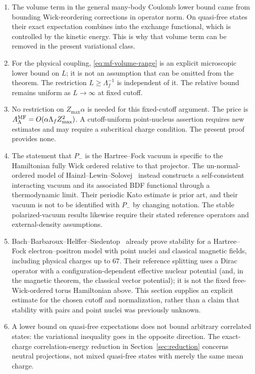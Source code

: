 \begin{remark}
\label{rem:mf-scope}
\begin{enumerate}[label=(\alph*)]
\item The volume term in the general many-body Coulomb lower bound came
from bounding Wick-reordering corrections in operator norm.  On quasi-free
states their exact expectation combines into the exchange functional,
which is controlled by the kinetic energy.  This is why that volume term
can be removed in the present variational class.
\item For the physical coupling, \eqref{eq:mf-volume-range} is an explicit
microscopic lower bound on $L$; it is not an assumption that can be omitted
from the theorem.  The restriction $L\ge\Lambda_f^{-1}$ is independent of
it.  The relative bound remains uniform as $L\to\infty$ at fixed cutoff.
\item No restriction on $Z_{\max}\alpha$ is needed for this fixed-cutoff
argument.  The price is $A^{\rm MF}_\Lambda=O(\alpha\Lambda_fZ_{\max}^2)$.
A cutoff-uniform point-nucleus assertion requires new estimates and may
require a subcritical charge condition.  The present proof provides none.
\item The statement that $P_-$ is the Hartree--Fock vacuum is specific to
the Hamiltonian fully Wick ordered relative to that projector.  The
un-normal-ordered model of Hainzl--Lewin--Solovej~\cite{HLSol2007} instead
constructs a self-consistent interacting vacuum and its associated BDF
functional through a thermodynamic limit.  Their periodic Kato estimate
is prior art, and their vacuum is not to be identified with $P_-$ by
changing notation.  The stable polarized-vacuum results
\cite{HLS2005,HLS2008} likewise require their stated reference operators
and external-density assumptions.
\item Bach--Barbaroux--Helffer--Siedentop~\cite{BBHS1998} already prove
stability for a Hartree--Fock electron--positron model with point nuclei
and classical magnetic fields, including physical charges up to $67$.
Their reference splitting uses a Dirac operator with a configuration-dependent
effective nuclear potential (and, in the magnetic theorem, the classical
vector potential); it is not the fixed free-Wick-ordered torus Hamiltonian above.
This section supplies an explicit estimate for the chosen cutoff and
normalization, rather than a claim that stability with pairs and point
nuclei was previously unknown.
\item A lower bound on quasi-free expectations does not bound arbitrary
correlated states: the variational inequality goes in the opposite
direction.  The exact-charge correlation-energy reduction in
Section~\ref{sec:reduction} concerns neutral projections, not mixed
quasi-free states with merely the same mean charge.
\end{enumerate}
\end{remark}


